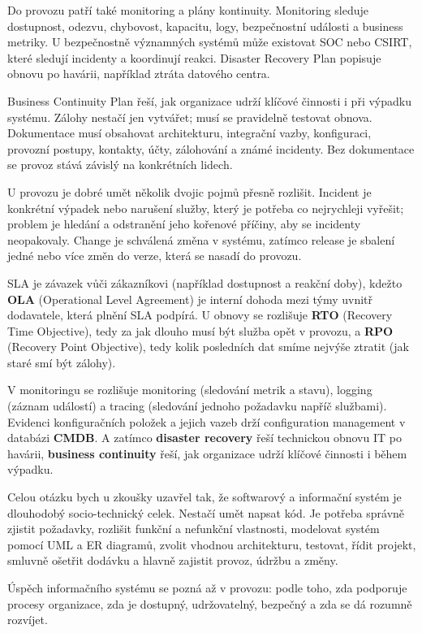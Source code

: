 Do provozu patří také monitoring a plány kontinuity. Monitoring sleduje dostupnost, odezvu, chybovost, kapacitu, logy, bezpečnostní události a business metriky. U bezpečnostně významných systémů může existovat SOC nebo CSIRT, které sledují incidenty a koordinují reakci. Disaster Recovery Plan popisuje obnovu po havárii, například ztráta datového centra.

Business Continuity Plan řeší, jak organizace udrží klíčové činnosti i při výpadku systému. Zálohy nestačí jen vytvářet; musí se pravidelně testovat obnova. Dokumentace musí obsahovat architekturu, integrační vazby, konfiguraci, provozní postupy, kontakty, účty, zálohování a známé incidenty. Bez dokumentace se provoz stává závislý na konkrétních lidech.

U provozu je dobré umět několik dvojic pojmů přesně rozlišit. Incident je konkrétní výpadek nebo narušení služby, který je potřeba co nejrychleji vyřešit; problem je hledání a odstranění jeho kořenové příčiny, aby se incidenty neopakovaly. Change je schválená změna v systému, zatímco release je sbalení jedné nebo více změn do verze, která se nasadí do provozu.

SLA je závazek vůči zákazníkovi (například dostupnost a reakční doby), kdežto \textbf{OLA} (Operational Level Agreement) je interní dohoda mezi týmy uvnitř dodavatele, která plnění SLA podpírá. U obnovy se rozlišuje \textbf{RTO} (Recovery Time Objective), tedy za jak dlouho musí být služba opět v provozu, a \textbf{RPO} (Recovery Point Objective), tedy kolik posledních dat smíme nejvýše ztratit (jak staré smí být zálohy).

V monitoringu se rozlišuje monitoring (sledování metrik a stavu), logging (záznam událostí) a tracing (sledování jednoho požadavku napříč službami). Evidenci konfiguračních položek a jejich vazeb drží configuration management v databázi \textbf{CMDB}. A zatímco \textbf{disaster recovery} řeší technickou obnovu IT po havárii, \textbf{business continuity} řeší, jak organizace udrží klíčové činnosti i během výpadku.

Celou otázku bych u zkoušky uzavřel tak, že softwarový a informační systém je dlouhodobý socio-technický celek. Nestačí umět napsat kód. Je potřeba správně zjistit požadavky, rozlišit funkční a nefunkční vlastnosti, modelovat systém pomocí UML a ER diagramů, zvolit vhodnou architekturu, testovat, řídit projekt, smluvně ošetřit dodávku a hlavně zajistit provoz, údržbu a změny.

Úspěch informačního systému se pozná až v provozu: podle toho, zda podporuje procesy organizace, zda je dostupný, udržovatelný, bezpečný a zda se dá rozumně rozvíjet.


